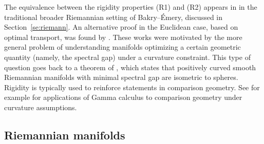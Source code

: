 \documentclass[10pt,reqno]{amsart}
\numberwithin{equation}{section}
\begin{document}
The equivalence between the rigidity properties (R1) and (R2) appears in
\cite{CZ17} in the traditional broader Riemannian setting of Bakry--Émery,
discussed in Section~\ref{se:riemann}. An alternative proof in the Euclidean
case, based on optimal transport, was found by \cite{DPF17}. These works were
motivated by the more general problem of understanding manifolds optimizing a
certain geometric quantity (namely, the spectral gap) under a curvature
constraint. This type of question goes back to a theorem of
\cite{zbMATH03188146}, which states that positively curved smooth Riemannian
manifolds with minimal spectral gap are isometric to spheres. Rigidity is
typically used to reinforce statements in comparison geometry. See for example
\cite{zbMATH01545688} for applications of Gamma calculus to comparison
geometry under curvature assumptions.

\subsection{Riemannian manifolds}\label{ss:riemann}
\end{document}

